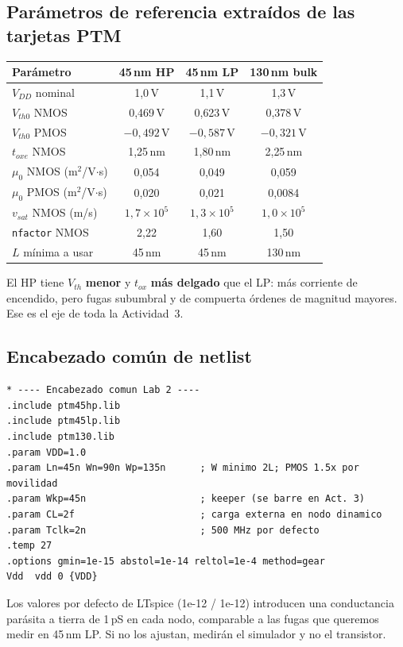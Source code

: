 \documentclass[11pt,a4paper]{article}
\begin{document}
\subsection{Parámetros de referencia extraídos de las tarjetas PTM}
\begin{center}\small
\begin{tabular}{@{}lccc@{}}
\toprule
\textbf{Parámetro} & \textbf{45\,nm HP} & \textbf{45\,nm LP} & \textbf{130\,nm bulk}\\
\midrule
$V_{DD}$ nominal & 1{,}0\,V & 1{,}1\,V & 1{,}3\,V\\
$V_{th0}$ NMOS & 0{,}469\,V & 0{,}623\,V & 0{,}378\,V\\
$V_{th0}$ PMOS & $-0{,}492$\,V & $-0{,}587$\,V & $-0{,}321$\,V\\
$t_{oxe}$ NMOS & 1{,}25\,nm & 1{,}80\,nm & 2{,}25\,nm\\
$\mu_0$ NMOS (m$^2$/V$\cdot$s) & 0{,}054 & 0{,}049 & 0{,}059\\
$\mu_0$ PMOS (m$^2$/V$\cdot$s) & 0{,}020 & 0{,}021 & 0{,}0084\\
$v_{sat}$ NMOS (m/s) & $1{,}7\times10^5$ & $1{,}3\times10^5$ & $1{,}0\times10^5$\\
\texttt{nfactor} NMOS & 2{,}22 & 1{,}60 & 1{,}50\\
$L$ mínima a usar & 45\,nm & 45\,nm & 130\,nm\\
\bottomrule
\end{tabular}
\end{center}
\begin{nota}
El HP tiene $V_{th}$ \textbf{menor} y $t_{ox}$ \textbf{más delgado} que el LP: más corriente de encendido, pero fugas subumbral y de compuerta órdenes de magnitud mayores. Ese es el eje de toda la Actividad~3.
\end{nota}

\subsection{Encabezado común de netlist}
\begin{lstlisting}
* ---- Encabezado comun Lab 2 ----
.include ptm45hp.lib
.include ptm45lp.lib
.include ptm130.lib
.param VDD=1.0
.param Ln=45n Wn=90n Wp=135n      ; W minimo 2L; PMOS 1.5x por movilidad
.param Wkp=45n                    ; keeper (se barre en Act. 3)
.param CL=2f                      ; carga externa en nodo dinamico
.param Tclk=2n                    ; 500 MHz por defecto
.temp 27
.options gmin=1e-15 abstol=1e-14 reltol=1e-4 method=gear
Vdd  vdd 0 {VDD}
\end{lstlisting}
\begin{nota}
Los valores por defecto de LTspice (1e-12 / 1e-12) introducen una conductancia parásita a tierra de 1\,pS en cada nodo, comparable a las fugas que queremos medir en 45\,nm LP. Si no los ajustan, medirán el simulador y no el transistor.
\end{nota}
\end{document}
